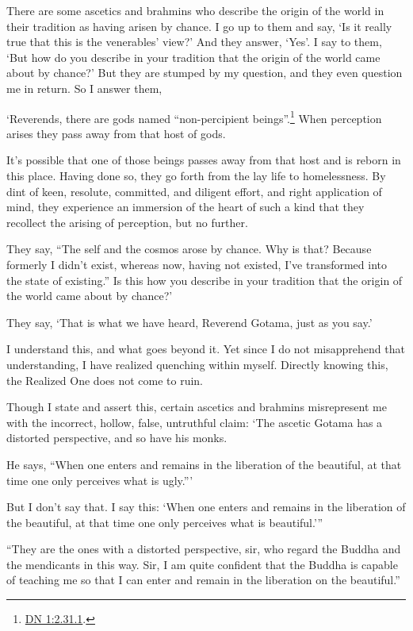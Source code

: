 \documentclass[12pt,openany]{book}%
\begin{document}
There are some ascetics and brahmins who describe the origin of the world in their tradition as having arisen by chance. I go up to them and say, ‘Is it really true that this is the venerables’ view?’ And they answer, ‘Yes’. I say to them, ‘But how do you describe in your tradition that the origin of the world came about by chance?’ But they are stumped by my question, and they even question me in return. So I answer them, 

‘Reverends, there are gods named “non-percipient beings”.\footnote{\href{https://suttacentral.net/dn1/en/sujato\#2.31.1}{DN 1:2.31.1}. } When perception arises they pass away from that host of gods. 

It’s possible that one of those beings passes away from that host and is reborn in this place. Having done so, they go forth from the lay life to homelessness. By dint of keen, resolute, committed, and diligent effort, and right application of mind, they experience an immersion of the heart of such a kind that they recollect the arising of perception, but no further. 

They say, “The self and the cosmos arose by chance. Why is that? Because formerly I didn’t exist, whereas now, having not existed, I’ve transformed into the state of existing.” Is this how you describe in your tradition that the origin of the world came about by chance?’ 

They say, ‘That is what we have heard, Reverend Gotama, just as you say.’ 

I understand this, and what goes beyond it. Yet since I do not misapprehend that understanding, I have realized quenching within myself. Directly knowing this, the Realized One does not come to ruin. 

Though I state and assert this, certain ascetics and brahmins misrepresent me with the incorrect, hollow, false, untruthful claim: ‘The ascetic Gotama has a distorted perspective, and so have his monks. 

He says, “When one enters and remains in the liberation of the beautiful, at that time one only perceives what is ugly.”’ 

But I don’t say that. I say this: ‘When one enters and remains in the liberation of the beautiful, at that time one only perceives what is beautiful.’” 

“They are the ones with a distorted perspective, sir, who regard the Buddha and the mendicants in this way. Sir, I am quite confident that the Buddha is capable of teaching me so that I can enter and remain in the liberation on the beautiful.” 
\end{document}
